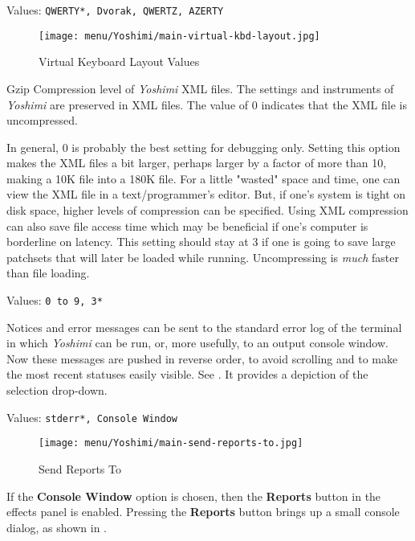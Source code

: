    Values: \texttt{QWERTY*, Dvorak, QWERTZ, AZERTY}

\begin{figure}[H]
   \centering 
   \texttt{[image: menu/Yoshimi/main-virtual-kbd-layout.jpg]}
   \caption[Virtual Keyboard Layout]{Virtual Keyboard Layout Values}
   \label{fig:virtual_kbd_layout} 
\end{figure}

   Gzip Compression level of \textsl{Yoshimi} XML files.
   The settings and instruments of
   \textsl{Yoshimi}
   are preserved in XML files.
   The value of 0 indicates that the XML file is uncompressed.

   In general, 0 is probably the best setting for debugging only.  Setting this
   option makes the XML files a bit larger, perhaps larger by a factor of more
   than 10, making a 10K file into a 180K file.  For a little "wasted" space
   and time, one can view the XML file in a text/programmer's editor.  But, if
   one's system is tight on disk space, higher levels of compression can be
   specified.  Using XML compression can also save file access time which may
   be beneficial if one's computer is borderline on latency.  This setting
   should stay at 3 if one is going to save large patchsets that will later be
   loaded while running. Uncompressing is \textsl{much} faster than file
   loading.

   Values: \texttt{0 to 9, 3*}

   Notices and error messages can be sent to the standard error log of
   the terminal in which 
   \textsl{Yoshimi} can be run, or, more usefully, to
   an output console window.
   Now these messages are pushed in reverse order, to avoid scrolling
   and to make the most recent statuses easily visible.
   See .
   It provides a depiction of the selection drop-down.

   Values: \texttt{stderr*, Console Window}

\begin{figure}[H]
   \centering 
   \texttt{[image: menu/Yoshimi/main-send-reports-to.jpg]}
   \caption[Send Reports]{Send Reports To}
   \label{fig:send_reports_to}
\end{figure}

   If the \textbf{Console Window} option is chosen, then the
   \textbf{Reports} button in the effects panel is enabled.
   Pressing the \textbf{Reports} button brings up a small console dialog, as
   shown in .


